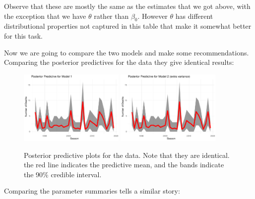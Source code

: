 \documentclass[10pt]{extarticle}
\begin{document}
Observe that these are mostly the same as the estimates that we got above, with the exception that we have $\theta$ rather than $\beta_0$. However $\theta$ has different distributional properties not captured in this table that make it somewhat better for this task. 

Now we are going to compare the two models and make some recommendations. Comparing the posterior predictives for the data they give identical results: 

\begin{figure}[H]
	\includegraphics[width = 0.45\textwidth]{../ppmod1}
	\includegraphics[width = 0.45\textwidth]{../ppmod2}
	\caption{Posterior predictive plots for the data. Note that they are identical. the red line indicates the predictive mean, and the bands indicate the 90\% credible interval.}
	\label{fig:postpreddata}
\end{figure}

Comparing the parameter summaries tells a similar story: 
\end{document}
